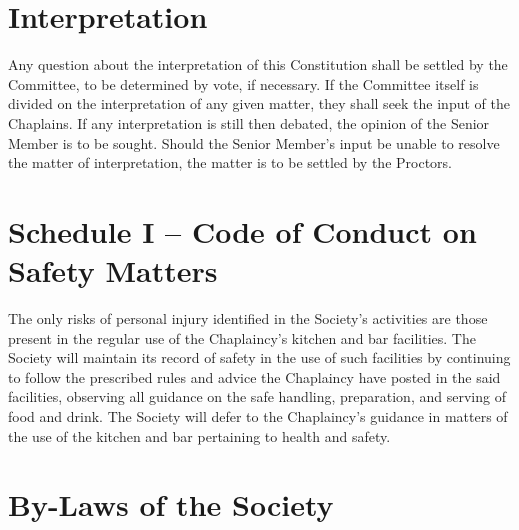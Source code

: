 \documentclass[11pt]{article}
\begin{document}
\section{Interpretation}
Any question about the interpretation of this Constitution shall be settled by the Committee, to be determined by vote, if necessary. If the Committee itself is divided on the interpretation of any given matter, they shall seek the input of the Chaplains. If any interpretation is still then debated, the opinion of the Senior Member is to be sought. Should the Senior Member's input be unable to resolve the matter of interpretation, the matter is to be settled by the Proctors.
\section{Schedule I -- Code of Conduct on Safety Matters}
The only risks of personal injury identified in the Society's activities are those present in the regular use of the Chaplaincy's kitchen and bar facilities. The Society will maintain its record of safety in the use of such facilities by continuing to follow the prescribed rules and advice the Chaplaincy have posted in the said facilities, observing all guidance on the safe handling, preparation, and serving of food and drink. The Society will defer to the Chaplaincy's guidance in matters of the use of the kitchen and bar pertaining to health and safety.
\newpage
\section{By-Laws of the Society}
\end{document}

